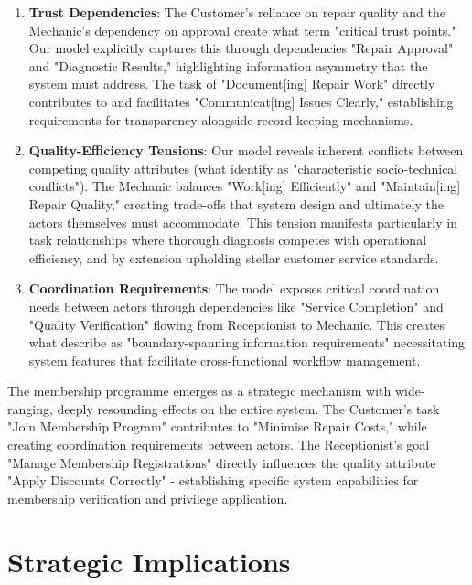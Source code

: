 \documentclass[14pt,a4paper]{article}
\begin{document}
\begin{enumerate}
  \item \textbf{Trust Dependencies}: The Customer's reliance on repair quality and the Mechanic's dependency on approval create what \textit{\parencite[p. 73]{Rifaut2020}} term "critical trust points." Our model explicitly captures this through dependencies "Repair Approval" and "Diagnostic Results," highlighting information asymmetry that the system must address. The task of "Document[ing] Repair Work" directly contributes to and facilitates "Communicat[ing] Issues Clearly," establishing requirements for transparency alongside record-keeping mechanisms.

  \item \textbf{Quality-Efficiency Tensions}: Our model reveals inherent conflicts between competing quality attributes (what \textit{\parencite[p. 41]{Lezcano2022}} identify as "characteristic socio-technical conflicts"). The Mechanic balances "Work[ing] Efficiently" and "Maintain[ing] Repair Quality," creating trade-offs that system design and ultimately the actors themselves must accommodate. This tension manifests particularly in task relationships where thorough diagnosis competes with operational efficiency, and by extension upholding stellar customer service standards.

  \item \textbf{Coordination Requirements}: The model exposes critical coordination needs between actors through dependencies like "Service Completion" and "Quality Verification" flowing from Receptionist to Mechanic. This creates what \textit{\parencite[p. 132]{Samavi2019}} describe as "boundary-spanning information requirements" necessitating system features that facilitate cross-functional workflow management.
\end{enumerate}

The membership programme emerges as a strategic mechanism with wide-ranging, deeply resounding effects on the entire system. The Customer's task "Join Membership Program" contributes to "Minimise Repair Costs," while creating coordination requirements between actors. The Receptionist's goal "Manage Membership Registrations" directly influences the quality attribute "Apply Discounts Correctly" - establishing specific system capabilities for membership verification and privilege application.

\section{Strategic Implications}
\end{document}
